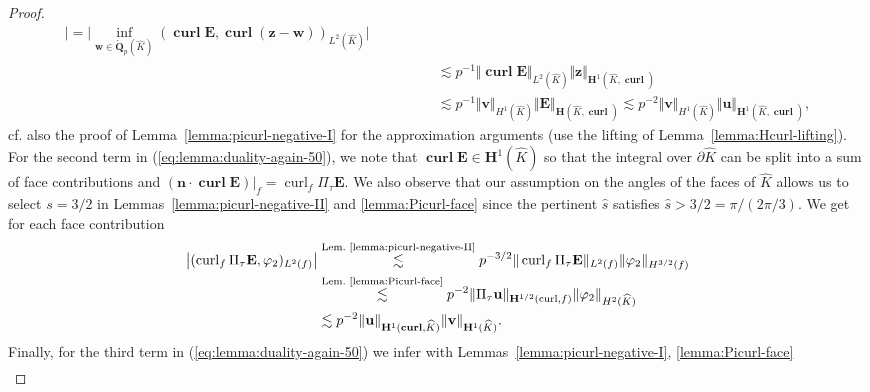 \documentclass{article}
\begin{document}
\begin{proof}
\begin{align}
\bigr| = \bigl| \operatorname*{inf}_{\mathbf{w}\in\mathring{\mathbf{Q}}_p(\widehat{K})} (\operatorname{\mathbf{curl}}\mathbf{E},\operatorname{\mathbf{curl}}(\mathbf{z}-\mathbf{w}))_{L^2(\widehat{K})} 
\bigr|\\
\nonumber 
& \qquad \qquad \lesssim p^{-1} \Vert\operatorname{\mathbf{curl}}\mathbf{E}\Vert_{L^2(\widehat{K})} \Vert\mathbf{z}\Vert_{\mathbf{H}^1(\widehat{K},\operatorname{\mathbf{curl}})} \\ 
\nonumber 
&
\qquad 
\qquad 
\lesssim p^{-1} \Vert\mathbf{v}\Vert_{H^1(\widehat{K})} \Vert\mathbf{E}\Vert_{\mathbf{H}(\widehat{K},\operatorname{\mathbf{curl}})}
\lesssim p^{-2} \Vert\mathbf{v}\Vert_{H^1(\widehat{K})} \Vert\mathbf{u}\Vert_{\mathbf{H}^1(\widehat{K},\operatorname{\mathbf{curl}})},
\end{align}
cf. also the proof of Lemma~\ref{lemma:picurl-negative-I} for the approximation arguments (use the lifting of Lemma~\ref{lemma:Hcurl-lifting}). For the second term in (\ref{eq:lemma:duality-again-50}), we note that 
$\operatorname*{\mathbf{curl}} {\mathbf E} \in {\mathbf H}^1(\widehat K)$ so that 
the integral over $\partial\widehat K$ can be split into a sum of face 
contributions and $({\mathbf n} \cdot 
\operatorname*{\mathbf{curl}} {\mathbf E})|_f  = \operatorname*{curl}_f \Pi_\tau {\mathbf E}$.
We also observe that our assumption on the angles of the faces of $\widehat K$ 
allows us to select $s = 3/2$ in Lemmas~\ref{lemma:picurl-negative-II} and \ref{lemma:Picurl-face}
since the pertinent $\widehat s$ satisfies $\widehat s > 3/2 = \pi/(2 \pi/3)$. 
We get for each face contribution
\begin{align}
\label{eq:lemma:duality-again-61}
 \bigl| (\operatorname{curl}_f\Pi_\tau\mathbf{E},\varphi_2)_{L^2(f)}\bigr|
& \stackrel{\text{Lem.~\ref{lemma:picurl-negative-II}}}{\lesssim} p^{-3/2} \Vert\operatorname{curl}_f\Pi_\tau\mathbf{E}\Vert_{L^2(f)} \Vert\varphi_2\Vert_{H^{3/2}(f)} \\
&\stackrel{\text{Lem.~\ref{lemma:Picurl-face}}}{\lesssim} p^{-2} \Vert\Pi_\tau\mathbf{u}\Vert_{\mathbf{H}^{1/2}(\operatorname{curl},f)} \Vert\varphi_2\Vert_{H^2(\widehat{K})} 
\\ \nonumber & 
\lesssim p^{-2} \Vert\mathbf{u}\Vert_{\mathbf{H}^1(\operatorname{\mathbf{curl}},\widehat{K})} \Vert\mathbf{v}\Vert_{\mathbf{H}^1(\widehat{K})}.
\end{align}
Finally, for the third term in (\ref{eq:lemma:duality-again-50}) we infer with 
Lemmas~\ref{lemma:picurl-negative-I}, \ref{lemma:Picurl-face} 
\begin{align}

\end{align}
\end{proof}
\end{document}
